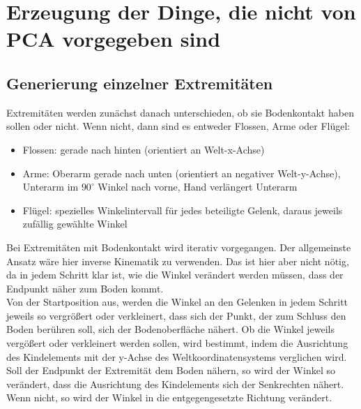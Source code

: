 \chapter{Erzeugung der Dinge, die nicht von PCA vorgegeben sind}

\section{Generierung einzelner Extremitäten}
\label{section:extremity_generation}


Extremitäten werden zunächst danach unterschieden, ob sie Bodenkontakt haben sollen oder nicht.
Wenn nicht, dann sind es entweder Flossen, Arme oder Flügel:

\begin{itemize}
 \item Flossen: gerade nach hinten (orientiert an Welt-x-Achse)
 \item Arme: Oberarm gerade nach unten (orientiert an negativer Welt-y-Achse), Unterarm im $90^{\circ}$ Winkel nach vorne, Hand verlängert Unterarm 
 \item Flügel: spezielles Winkelintervall für jedes beteiligte Gelenk, daraus jeweils zufällig gewählte Winkel
\end{itemize}

Bei Extremitäten mit Bodenkontakt wird iterativ vorgegangen. Der allgemeinste Ansatz wäre hier inverse Kinematik zu verwenden. Das ist hier aber nicht nötig, da in jedem Schritt klar ist, wie die Winkel verändert werden müssen, dass der Endpunkt näher zum Boden kommt. \\
Von der Startposition aus, werden die Winkel an den Gelenken in jedem Schritt jeweils so vergrößert oder verkleinert, dass sich der Punkt, der zum Schluss den Boden berühren soll, sich der Bodenoberfläche nähert. Ob die Winkel jeweils vergößert oder verkleinert werden sollen, wird bestimmt, indem die Ausrichtung des Kindelements mit der y-Achse des Weltkoordinatensystems verglichen wird. Soll der Endpunkt der Extremität dem Boden nähern, so wird der Winkel so verändert, dass die Ausrichtung des Kindelements sich der Senkrechten nähert. Wenn nicht, so wird der Winkel in die entgegengesetzte Richtung verändert. 

